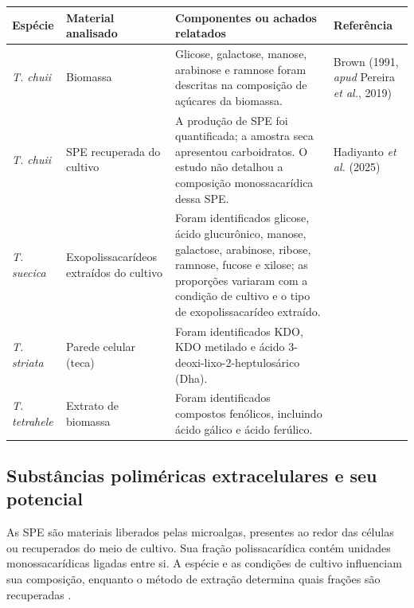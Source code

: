 \begin{table}[H]
\centering
\small
\setlength{\tabcolsep}{3pt}
\renewcommand{\arraystretch}{1.12}
\label{quad:compostos_tetraselmis}
\vspace{3pt}
\begin{tabular}{|C{2.2cm}|C{3.2cm}|C{7.2cm}|C{2.7cm}|}
\hline
\textbf{Espécie} & \textbf{Material analisado} & \textbf{Componentes ou achados relatados} & \textbf{Referência} \\
\hline
\textit{T. chuii} & Biomassa & Glicose, galactose, manose, arabinose e ramnose foram descritas na composição de açúcares da biomassa. & Brown (1991, \textit{apud} Pereira \textit{et al.}, 2019) \\
\hline
\textit{T. chuii} & SPE recuperada do cultivo & A produção de SPE foi quantificada; a amostra seca apresentou carboidratos. O estudo não detalhou a composição monossacarídica dessa SPE. & Hadiyanto \textit{et al.} (2025) \\
\hline
\textit{T. suecica} & Exopolissacarídeos extraídos do cultivo & Foram identificados glicose, ácido glucurônico, manose, galactose, arabinose, ribose, ramnose, fucose e xilose; as proporções variaram com a condição de cultivo e o tipo de exopolissacarídeo extraído. & \textcite{parra2020} \\
\hline
\textit{T. striata} & Parede celular (teca) & Foram identificados KDO, KDO metilado e ácido 3-deoxi-lixo-2-heptulosárico (Dha). & \textcite{becker1989} \\
\hline
\textit{T. tetrahele} & Extrato de biomassa & Foram identificados compostos fenólicos, incluindo ácido gálico e ácido ferúlico. & \textcite{mai2026} \\
\hline
\end{tabular}
\end{table}


\subsection{Substâncias poliméricas extracelulares e seu potencial}
As SPE são materiais liberados pelas microalgas, presentes ao redor das células ou recuperados do meio de cultivo. Sua fração polissacarídica contém unidades monossacarídicas ligadas entre si. A espécie e as condições de cultivo influenciam sua composição, enquanto o método de extração determina quais frações são recuperadas \parencite{delattre2016,he2025}.

